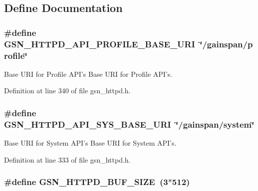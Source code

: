 \subsection{Define Documentation}
\hypertarget{a00666_ga0d52f5c67895eb49f4680ca1b4d97498}{
\subsubsection[{GSN\_\-HTTPD\_\-API\_\-PROFILE\_\-BASE\_\-URI}]{\setlength{\rightskip}{0pt plus 5cm}\#define GSN\_\-HTTPD\_\-API\_\-PROFILE\_\-BASE\_\-URI~\char`\"{}/gainspan/profile\char`\"{}}}
\label{a00666_ga0d52f5c67895eb49f4680ca1b4d97498}


Base URI for Profile API's Base URI for Profile API's. 



Definition at line 340 of file gsn\_\-httpd.h.

\hypertarget{a00666_gad35e4cccb1b941e871e8679071c231ff}{
\subsubsection[{GSN\_\-HTTPD\_\-API\_\-SYS\_\-BASE\_\-URI}]{\setlength{\rightskip}{0pt plus 5cm}\#define GSN\_\-HTTPD\_\-API\_\-SYS\_\-BASE\_\-URI~\char`\"{}/gainspan/system\char`\"{}}}
\label{a00666_gad35e4cccb1b941e871e8679071c231ff}


Base URI for System API's Base URI for System API's. 



Definition at line 333 of file gsn\_\-httpd.h.

\hypertarget{a00666_ga65ea05b0dabc770285f0a18270af5fc7}{
\subsubsection[{GSN\_\-HTTPD\_\-BUF\_\-SIZE}]{\setlength{\rightskip}{0pt plus 5cm}\#define GSN\_\-HTTPD\_\-BUF\_\-SIZE~(3$\ast$512)}}
\label{a00666_ga65ea05b0dabc770285f0a18270af5fc7}



